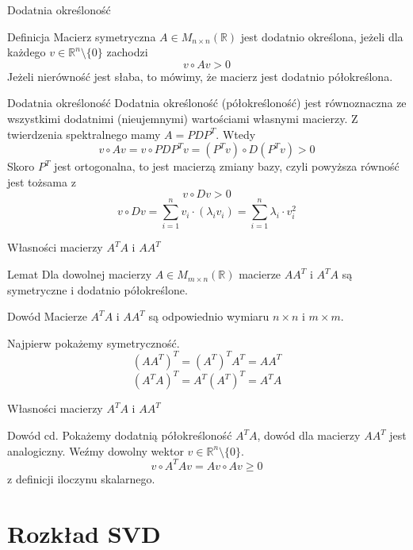 \documentclass{beamer}
\begin{document}
\begin{frame}{Dodatnia określoność}
\begin{block}{Definicja}
Macierz symetryczna $A \in M_{n \times n} (\mathbb{R})$ jest dodatnio określona, jeżeli dla każdego $v \in \mathbb{R}^n \setminus \{ 0 \}$ zachodzi
$$ v \circ Av > 0 $$
Jeżeli nierówność jest słaba, to mówimy, że macierz jest dodatnio półokreślona.
\end{block}
    
\end{frame}

\begin{frame}{Dodatnia określoność}
Dodatnia określoność (półokreśloność) jest równoznaczna ze wszystkimi dodatnimi (nieujemnymi) wartościami własnymi macierzy. Z twierdzenia spektralnego mamy $A = PDP^T$. Wtedy 
$$ v \circ Av = v \circ PDP^Tv = (P^Tv) \circ D(P^Tv) > 0 $$ \pause
Skoro $P^T$ jest ortogonalna, to jest macierzą zmiany bazy, czyli powyższa równość jest tożsama z
$$ v \circ Dv > 0 $$
$$ v \circ Dv = \sum_{i = 1}^n v_i \cdot (\lambda_i v_i) = \sum_{i = 1}^n \lambda_i \cdot v_i^2 $$
\end{frame}

\begin{frame}{Własności macierzy $A^TA$ i $AA^T$}
\begin{block}{Lemat}
Dla dowolnej macierzy $A \in M_{m \times n} (\mathbb{R})$ macierze $AA^T$ i $A^TA$ są symetryczne i dodatnio półokreślone.
\end{block}

\pause
\begin{block}{Dowód}
Macierze $A^TA$ i $AA^T$ są odpowiednio wymiaru $n \times n$ i $m \times m$.

Najpierw pokażemy symetryczność.
$$ (AA^T)^T = (A^T)^T  A^T = AA^T $$
$$ (A^TA)^T = A^T (A^T)^T = A^TA $$
\end{block}
\end{frame}

\begin{frame}{Własności macierzy $A^TA$ i $AA^T$}
\begin{block}{Dowód cd.}
Pokażemy dodatnią półokreśloność $A^TA$, dowód dla macierzy $AA^T$ jest analogiczny.
Weźmy dowolny wektor $v \in \mathbb{R}^n \setminus \{ 0\}$.
$$ v \circ A^TA v = Av \circ Av \geq 0 $$
z definicji iloczynu skalarnego.
\end{block}
\end{frame}

\section{Rozkład SVD}
\end{document}
